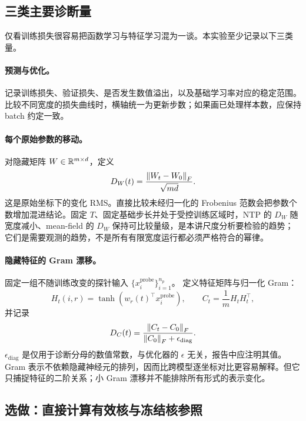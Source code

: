 \subsection{三类主要诊断量}

仅看训练损失很容易把函数学习与特征学习混为一谈。本实验至少记录以下三类量。

\paragraph{预测与优化。}
记录训练损失、验证损失、是否发生数值溢出，以及基础学习率对应的稳定范围。比较不同宽度的损失曲线时，横轴统一为更新步数；如果画已处理样本数，应保持 batch 约定一致。

\paragraph{每个原始参数的移动。}
对隐藏矩阵 $W\in\mathbb R^{m\times d}$，定义
\begin{equation}
 D_W(t)=\frac{\left\lVert W_t-W_0\right\rVert_F}{\sqrt{md}}.
 \label{l5:weight-rms}
\end{equation}
这是原始坐标下的变化 RMS。直接比较未经归一化的 Frobenius 范数会把参数个数增加混进结论。固定 $T$、固定基础步长并处于受控训练区域时，NTP 的 $D_W$ 随宽度减小、mean-field 的 $D_W$ 保持可比较量级，是本讲尺度分析要检验的趋势；它们是需要观测的趋势，不是所有有限宽度运行都必须严格符合的幂律。

\paragraph{隐藏特征的 Gram 漂移。}
固定一组不随训练改变的探针输入 $\{x_i^{\mathrm{probe}}\}_{i=1}^{n_p}$。
定义特征矩阵与归一化 Gram：
\begin{equation}
 H_t(i,r)=\tanh(w_r(t)^\top x_i^{\mathrm{probe}}),
 \qquad C_t=\frac1mH_tH_t^\top,
\end{equation}
并记录
\begin{equation}
 D_C(t)=\frac{\left\lVert C_t-C_0\right\rVert_F}
 {\left\lVert C_0\right\rVert_F+\epsilon_{\mathrm{diag}}}.
 \label{l5:feature-drift}
\end{equation}
$\epsilon_{\mathrm{diag}}$ 是仅用于诊断分母的数值常数，与优化器的
$\epsilon$ 无关，报告中应注明其值。Gram 表示不依赖隐藏神经元的排列，因而比跨模型逐坐标对比更容易解释。但它只捕捉特征的二阶关系；小 Gram 漂移并不能排除所有形式的表示变化。

\subsection{选做：直接计算有效核与冻结核参照}

